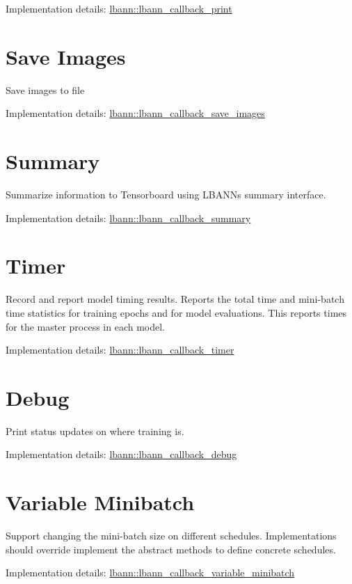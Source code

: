 Implementation details\+: \hyperlink{classlbann_1_1lbann__callback__print}{lbann\+::lbann\+\_\+callback\+\_\+print}\hypertarget{callbacks_save_images}{}\section{Save Images}\label{callbacks_save_images}
Save images to file

Implementation details\+: \hyperlink{classlbann_1_1lbann__callback__save__images}{lbann\+::lbann\+\_\+callback\+\_\+save\+\_\+images}\hypertarget{callbacks_summary}{}\section{Summary}\label{callbacks_summary}
Summarize information to Tensorboard using L\+B\+A\+NN\textquotesingle{}s summary interface.

Implementation details\+: \hyperlink{classlbann_1_1lbann__callback__summary}{lbann\+::lbann\+\_\+callback\+\_\+summary}\hypertarget{callbacks_timer}{}\section{Timer}\label{callbacks_timer}
Record and report model timing results. Reports the total time and mini-\/batch time statistics for training epochs and for model evaluations. This reports times for the master process in each model.

Implementation details\+: \hyperlink{classlbann_1_1lbann__callback__timer}{lbann\+::lbann\+\_\+callback\+\_\+timer}\hypertarget{callbacks_dbg}{}\section{Debug}\label{callbacks_dbg}
Print status updates on where training is.

Implementation details\+: \hyperlink{classlbann_1_1lbann__callback__debug}{lbann\+::lbann\+\_\+callback\+\_\+debug}\hypertarget{callbacks_variable_mb}{}\section{Variable Minibatch}\label{callbacks_variable_mb}
Support changing the mini-\/batch size on different schedules. Implementations should override implement the abstract methods to define concrete schedules.

Implementation details\+: \hyperlink{classlbann_1_1lbann__callback__variable__minibatch}{lbann\+::lbann\+\_\+callback\+\_\+variable\+\_\+minibatch} 